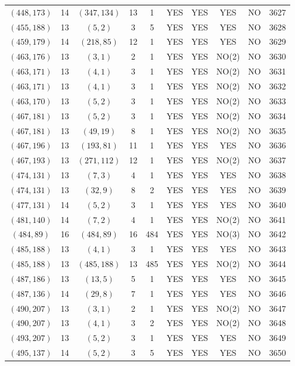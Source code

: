 \begin{longtable}{|c|c|c|c|c|c|c|c|c|c|}
$(448, 173)$ & 14 & $(347, 134)$ & 13 & 1 & YES & YES & YES & NO & 3627\\
$(455, 188)$ & 13 & $(5, 2)$ & 3 & 5 & YES & YES & YES & NO & 3628\\
$(459, 179)$ & 14 & $(218, 85)$ & 12 & 1 & YES & YES & YES & NO & 3629\\
$(463, 176)$ & 13 & $(3, 1)$ & 2 & 1 & YES & YES & NO(2) & NO & 3630\\
$(463, 171)$ & 13 & $(4, 1)$ & 3 & 1 & YES & YES & NO(2) & NO & 3631\\
$(463, 171)$ & 13 & $(4, 1)$ & 3 & 1 & YES & YES & NO(2) & NO & 3632\\
$(463, 170)$ & 13 & $(5, 2)$ & 3 & 1 & YES & YES & NO(2) & NO & 3633\\
$(467, 181)$ & 13 & $(5, 2)$ & 3 & 1 & YES & YES & NO(2) & NO & 3634\\
$(467, 181)$ & 13 & $(49, 19)$ & 8 & 1 & YES & YES & NO(2) & NO & 3635\\
$(467, 196)$ & 13 & $(193, 81)$ & 11 & 1 & YES & YES & YES & NO & 3636\\
$(467, 193)$ & 13 & $(271, 112)$ & 12 & 1 & YES & YES & NO(2) & NO & 3637\\
$(474, 131)$ & 13 & $(7, 3)$ & 4 & 1 & YES & YES & YES & NO & 3638\\
$(474, 131)$ & 13 & $(32, 9)$ & 8 & 2 & YES & YES & YES & NO & 3639\\
$(477, 131)$ & 14 & $(5, 2)$ & 3 & 1 & YES & YES & YES & NO & 3640\\
$(481, 140)$ & 14 & $(7, 2)$ & 4 & 1 & YES & YES & NO(2) & NO & 3641\\
$(484, 89)$ & 16 & $(484, 89)$ & 16 & 484 & YES & YES & NO(3) & NO & 3642\\
$(485, 188)$ & 13 & $(4, 1)$ & 3 & 1 & YES & YES & YES & NO & 3643\\
$(485, 188)$ & 13 & $(485, 188)$ & 13 & 485 & YES & YES & NO(2) & NO & 3644\\
$(487, 186)$ & 13 & $(13, 5)$ & 5 & 1 & YES & YES & YES & NO & 3645\\
$(487, 136)$ & 14 & $(29, 8)$ & 7 & 1 & YES & YES & YES & NO & 3646\\
$(490, 207)$ & 13 & $(3, 1)$ & 2 & 1 & YES & YES & NO(2) & NO & 3647\\
$(490, 207)$ & 13 & $(4, 1)$ & 3 & 2 & YES & YES & NO(2) & NO & 3648\\
$(493, 207)$ & 13 & $(5, 2)$ & 3 & 1 & YES & YES & YES & NO & 3649\\
$(495, 137)$ & 14 & $(5, 2)$ & 3 & 5 & YES & YES & YES & NO & 3650\\

\end{longtable}
